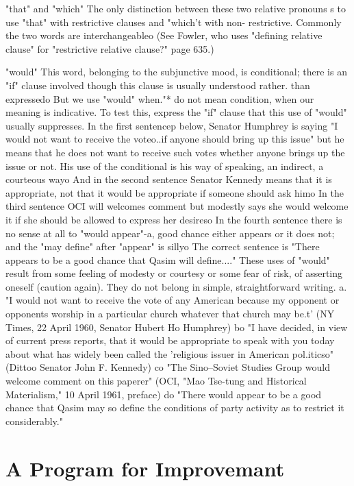 \documentclass[
    oneside,
    11pt,
    draft
]{memoir}
\begin{document}
"that" and "which" The only distinction between these two relative pronouns s to use "that" with restrictive clauses and "which't with non- restrictive. Commonly the two words are interchangeableo (See Fowler, who uses "defining relative clause" for "restrictive relative clause?" page 635.) 

"would" This word, belonging to the subjunctive mood, is conditional; there is an "if" clause involved though this clause is usually understood rather. than expressedo But we use "would" when."* do not mean condition, when our meaning is indicative. To test this, express the "if" clause that this use of "would" usually suppresses. In the first sentencep below, Senator Humphrey is saying "I would not want to receive the voteo..if anyone should bring up this issue" but he means that he does not want to receive such votes whether anyone brings up the issue or not. His use of the conditional is his way of speaking, an indirect, a courteous wayo And in the second sentence Senator Kennedy means that it is appropriate, not that it would be appropriate if someone should ask himo In the third sentence OCI will welcomes comment but modestly says she would welcome it if she should be allowed to express her desireso In the fourth sentence there is no sense at all to "would appear"-a, good chance either appears or it does not; and the "may define" after "appear" is sillyo The correct sentence is "There appears to be a good chance that Qasim will define...." These uses of "would" result from some feeling of modesty or courtesy or some fear of risk, of asserting oneself (caution again). They do not belong in simple, straightforward writing. a. "I would not want to receive the vote of any American because my opponent or opponents worship in a particular church whatever that church may be.t' (NY Times, 22 April 1960, Senator Hubert Ho Humphrey) bo "I have decided, in view of current press reports, that it would be appropriate to speak with you today about what has widely been called the 'religious issuer in American pol.iticso" (Dittoo Senator John F. Kennedy) co "The Sino--Soviet Studies Group would welcome comment on this paperer" (OCI, "Mao Tse-tung and Historical Materialism," 10 April 1961,
preface) do "There would appear to be a good chance that Qasim may so define the conditions of party activity as to restrict it considerably."

\chapter{A Program for Improvemant}
\end{document}
